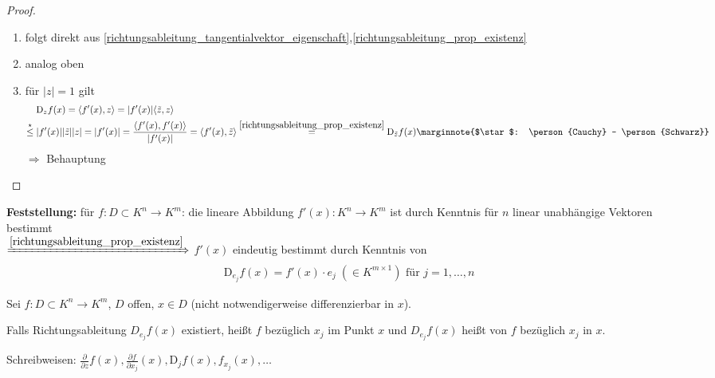 \begin{proof}\hspace*{0pt}
	\begin{enumerate}[label={\arabic*)},topsep=\dimexpr -\baselineskip / 2 \relax]
		\item folgt direkt aus \eqref{richtungsableitung_tangentialvektor_eigenschaft},\eqref{richtungsableitung_prop_existenz}
		\item analog oben
		\item für $\vert z \vert = 1$ gilt
		\zeroAmsmathAlignVSpaces \begin{align*}
			&\mathrm{D}_z f(x) = \langle f'(x), z \rangle = \vert f'(x) \vert \langle \tilde{z},z\rangle \\
			\overset{\star}{\le}\; &\vert f'(x) \vert  \vert \tilde{z}\vert \vert z \vert = \vert f'(x)\vert = \frac{\langle f'(x), f'(x)\rangle}{\vert f'(x) \vert} = \langle f'(x), \tilde{z} \rangle \overset{\eqref{richtungsableitung_prop_existenz}}{=} \mathrm{D}_{\tilde{z}}f(x)\marginnote{$\star$: \person{Cauchy} - \person{Schwarz}}
		\end{align*}
		$\Rightarrow$ Behauptung
	\end{enumerate}
\end{proof}

\textbf{Feststellung:} für $f:D\subset K^n\to K^m$: die lineare Abbildung $f'(x):K^n\to K^m$ ist durch Kenntnis für $n$ linear unabhängige Vektoren bestimmt\\
	$\xRightarrow{\eqref{richtungsableitung_prop_existenz}}$ $f'(x)$ eindeutig bestimmt durch Kenntnis von \begin{align*}
		\mathrm{D}_{e_j} f(x) = f'(x) \cdot e_j \;(\in K^{m\times 1}) \text{ für } j = 1,\dotsc,n
	\end{align*}

\begin{*definition}
	Sei $f:D\subset K^n\to K^m$, $D$ offen, $x\in D$ (nicht notwendigerweise \gls{differenzierbar} in $x$).
	
	Falls Richtungsableitung $D_{e_j} f(x)$ existiert, heißt $f$  bezüglich $x_j$ im Punkt $x$ und $D_{e_j} f(x)$ heißt  von $f$ bezüglich $x_j$ in $x$.
	
	Schreibweisen: $\frac{\partial }{\partial z}f(x), \frac{\partial f}{\partial x_j}(x), \mathrm{D}_j f(x), f_{x_j}(x), \dotsc$
\end{*definition}

